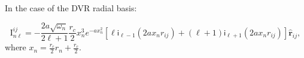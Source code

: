 \documentclass[
journal=jctcce, %
manuscript=article, layout=onecolumn]{achemso}
\begin{document}
In the case of the DVR radial basis:

\begin{equation}
    \text{I}_{n\ell}^{ij} = -\frac{2a\sqrt{\omega_n}}{2\ell+1}\frac{r_c}{2}  x_n^3 e^{-ax_n^2} [\ell\mathsf{i}_{\ell-1}(2a x_n r_{ij})+(\ell+1)\mathsf{i}_{\ell+1}(2a x_n r_{ij})] \hat{\mathbf{r}}_{ij},
\end{equation}
where $x_n=\frac{r_c}{2}r_n+\frac{r_c}{2}$.



\end{document}
